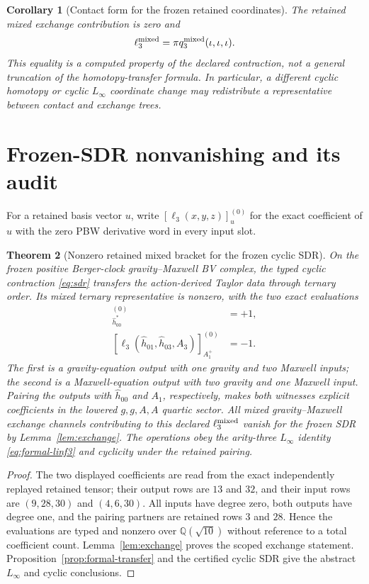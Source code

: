 \documentclass[11pt]{article}
\newtheorem{theorem}{Theorem}[section]
\newtheorem{corollary}[theorem]{Corollary}
\theoremstyle{definition}
\theoremstyle{remark}
\newcommand{\Q}{\mathbb Q}
\begin{document}
\begin{corollary}[Contact form for the frozen retained coordinates]
\label{cor:contact}
The retained mixed exchange contribution is zero and
\begin{equation}
 \ell_3^{\rm mixed}=\pi q_3^{\rm mixed}(\iota,\iota,\iota).
\end{equation}
This equality is a computed property of the declared contraction, not a
general truncation of the homotopy-transfer formula.  In particular, a
different cyclic homotopy or cyclic $L_\infty$ coordinate change may
redistribute a representative between contact and exchange trees.
\end{corollary}

\section{Frozen-SDR nonvanishing and its audit}\label{sec:theorem}

For a retained basis vector $u$, write
$[\ell_3(x,y,z)]_{u}^{(0)}$ for the exact coefficient of $u$ with the zero
PBW derivative word in every input slot.

\begin{theorem}[Nonzero retained mixed bracket for the frozen cyclic SDR]
\label{thm:survival}
On the frozen positive Berger-clock gravity--Maxwell BV complex, the typed
cyclic contraction \eqref{eq:sdr} transfers the action-derived Taylor data
through ternary order.  Its mixed ternary representative is nonzero, with the
two exact evaluations
\begin{align}
 [\ell_3(\widehat h_{13},A_1,A_3)]_{\widehat h^*_{00}}^{(0)}&=+1,
 \label{eq:gravity-witness}\\
 [\ell_3(\widehat h_{01},\widehat h_{03},A_3)]_{A^+_1}^{(0)}&=-1.
 \label{eq:maxwell-witness}
\end{align}
The first is a gravity-equation output with one gravity and two Maxwell
inputs; the second is a Maxwell-equation output with two gravity and one
Maxwell input.  Pairing the outputs with $\widehat h_{00}$ and $A_1$,
respectively, makes both witnesses explicit coefficients in the lowered
$g,g,A,A$ quartic sector.  All mixed gravity--Maxwell exchange channels
contributing to this declared $\ell_3^{\rm mixed}$ vanish for the frozen SDR
by Lemma~\ref{lem:exchange}.  The operations obey the arity-three
$L_\infty$ identity \eqref{eq:formal-linf3} and cyclicity under the retained
pairing.
\end{theorem}

\begin{proof}
The two displayed coefficients are read from the exact independently replayed
retained tensor; their output rows are $13$ and $32$, and their input rows are
$(9,28,30)$ and $(4,6,30)$.  All inputs have degree zero, both outputs have
degree one, and the pairing partners are retained rows $3$ and $28$.  Hence
the evaluations are typed and nonzero over $\Q(\sqrt{10})$ without reference
to a total coefficient count.  Lemma~\ref{lem:exchange} proves the scoped
exchange statement.  Proposition~\ref{prop:formal-transfer} and the certified
cyclic SDR give the abstract $L_\infty$ and cyclic conclusions.
\end{proof}
\end{document}
